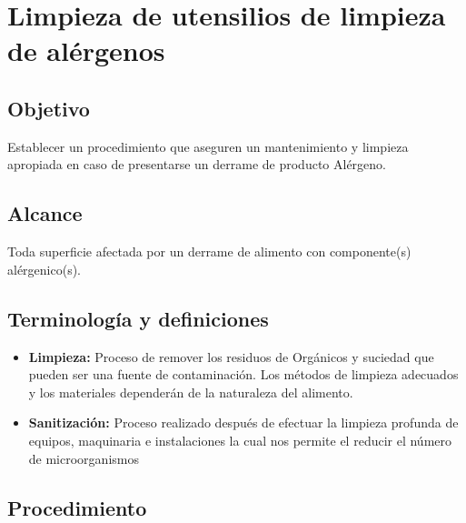 \thispagestyle{formato-PI}
\renewcommand{\MenorVer}{0}
\renewcommand{\MayorVer}{2}
\renewcommand{\Codigo}{HYS-13-IT}
\renewcommand{\FechaPub}{2023--01}
\renewcommand{\Titulo}{Limpieza de utensilios de limpieza de alérgenos}

\section{\Titulo}

\subsection{Objetivo}
Establecer un procedimiento que aseguren un mantenimiento y limpieza apropiada en caso de presentarse un derrame de producto Alérgeno.

\subsection{Alcance}
Toda superficie afectada por un derrame de alimento con componente(s) alérgenico(s).

\subsection{Terminología y definiciones}
\begin{itemize}
	\item \textbf{Limpieza:} Proceso de remover los residuos de Orgánicos y suciedad que pueden ser una fuente de contaminación. Los métodos de limpieza adecuados y los materiales dependerán de la naturaleza del alimento.
	\item \textbf{Sanitización:} Proceso realizado después de efectuar la limpieza profunda de equipos, maquinaria e instalaciones la cual nos permite el reducir el número de microorganismos
\end{itemize}
\subsection{Procedimiento}
